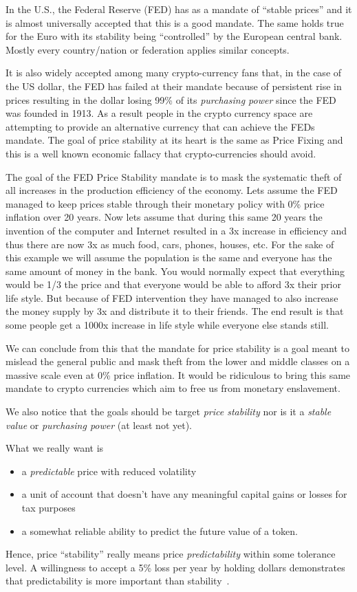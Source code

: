 In the U.S., the Federal Reserve (FED) has as a mandate of ``stable prices''
and it is almost universally accepted that this is a good mandate. The same
holds true for the Euro with its stability being ``controlled'' by the European
central bank. Mostly every country/nation or federation applies similar
concepts.

It is also widely accepted among many crypto-currency fans that, in the case of
the US dollar, the FED has failed at their mandate because of persistent rise
in prices resulting in the dollar losing 99\% of its \emph{purchasing power}
since the FED was founded in 1913. As a result people in the crypto currency
space are attempting to provide an alternative currency that can achieve the
FEDs mandate. The goal of price stability at its heart is the same as Price
Fixing and this is a well known economic fallacy that crypto-currencies should
avoid.

The goal of the FED Price Stability mandate is to mask the systematic theft of
all increases in the production efficiency of the economy. Lets assume the FED
managed to keep prices stable through their monetary policy with 0\% price
inflation over 20 years. Now lets assume that during this same 20 years the
invention of the computer and Internet resulted in a 3x increase in efficiency
and thus there are now 3x as much food, cars, phones, houses, etc. For the sake
of this example we will assume the population is the same and everyone has the
same amount of money in the bank. You would normally expect that everything
would be 1/3 the price and that everyone would be able to afford 3x their prior
life style. But because of FED intervention they have managed to also increase
the money supply by 3x and distribute it to their friends. The end result is
that some people get a 1000x increase in life style while everyone else stands
still.

We can conclude from this that the mandate for price stability is a goal meant
to mislead the general public and mask theft from the lower and middle classes
on a massive scale even at 0\% price inflation. It would be ridiculous to bring
this same mandate to crypto currencies which aim to free us from monetary
enslavement.

We also notice that the goals should be target \emph{price stability} nor is it
a \emph{stable value} or \emph{purchasing power} (at least not yet). 

What we really want is 
\begin{itemize}
 \item a \emph{predictable} price with reduced volatility
 \item a unit of account that doesn't have any meaningful capital gains or
    losses for tax purposes
 \item a somewhat reliable ability to predict the future value of a token.
\end{itemize}

Hence, price ``stability'' really means price \emph{predictability} within some
tolerance level. A willingness to accept a 5\% loss per year by holding dollars
demonstrates that predictability is more important than
stability~\cite{bm:stable:impossible}.
